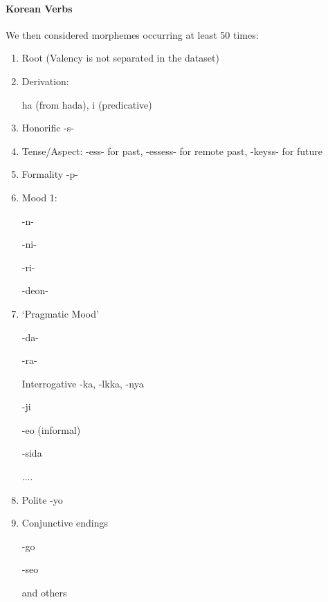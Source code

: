 \documentclass[11pt,letterpaper]{article}
\begin{document}
\paragraph{Korean Verbs}

We then considered morphemes occurring at least 50 times:

\begin{enumerate}
    \item Root (Valency is not separated in the dataset)
    \item Derivation:
    
    ha (from hada), i (predicative)
    
    \item Honorific -s-
    \item Tense/Aspect: -ess- for past, -essess- for remote past, -keyss- for future
    \item Formality -p-
    \item Mood 1:
    
    -n-
    
    -ni-
    
    -ri-
    
    -deon-
    
    \item `Pragmatic Mood'
    
    -da-
    
    -ra-
    
    Interrogative -ka, -lkka, -nya
    
    -ji
    
    -eo (informal)
    
    -sida
    
    ....
    
    \item Polite -yo
    \item Conjunctive endings
    
    -go
    
    -seo
    
    and others
    
\end{enumerate}

\end{document}
